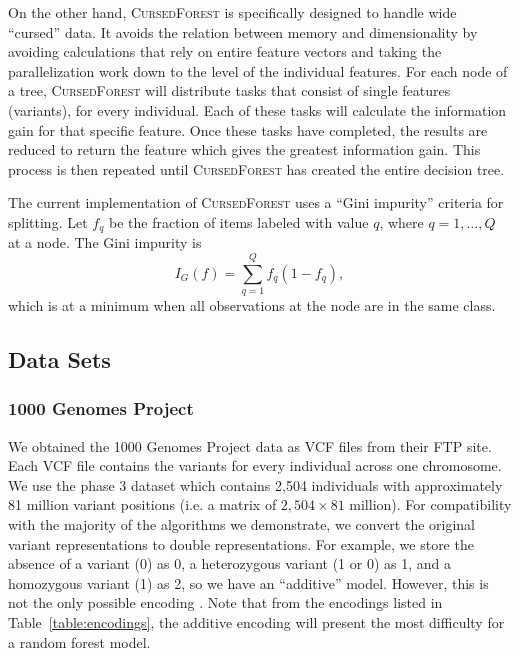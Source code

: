 \documentclass[10pt,letterpaper]{article}
\newcommand{\cursedforest}{\textsc{CursedForest}\xspace}
\begin{document}
On the other hand, \cursedforest is specifically designed to handle wide ``cursed'' data. It avoids the relation between
memory and dimensionality by avoiding calculations that rely on entire feature vectors and taking the parallelization
work down to the level of the individual features.  For each node of a tree, \cursedforest will distribute
tasks that consist of single features (variants), for every individual.  Each of these tasks will calculate the
information gain for that specific feature.  Once these tasks have completed, the results are reduced to return the
feature which gives the greatest information gain.  This process is then repeated until \cursedforest has created the
entire decision tree.

The current implementation of \cursedforest uses a ``Gini impurity'' criteria for splitting. Let $f_q$ be the fraction
of items labeled with value $q$, where $q = 1, \ldots, Q$ at a node. The Gini impurity is
$$
I_G(f) = \sum_{q = 1}^Q f_q ( 1 - f_q ), 
$$
which is at a minimum when all observations at the node are in the same class.

\subsection{Data Sets}
\subsubsection{1000 Genomes Project}
We obtained the 1000 Genomes Project data as VCF files from their FTP site.  Each VCF file contains the variants for
every individual across one chromosome.  We use the phase 3 dataset which contains 2,504 individuals with approximately
81 million variant positions (i.e. a matrix of $2,504 \times 81$ million).  For compatibility with the majority of the
algorithms we demonstrate, we convert the original variant representations to double representations.  For example, we
store the absence of a variant (0) as 0, a heterozygous
variant (1 or 0) as 1, and a
homozygous variant (1) as 2, so we have an ``additive'' model.  However, this is not the only possible encoding \cite{Goldstein.et.al.2011}. Note that from
the encodings listed in Table~\ref{table:encodings}, the additive encoding will present the most difficulty for a random
forest model.
\end{document}

